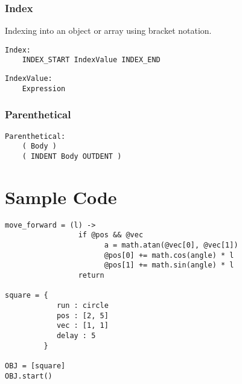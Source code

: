 \documentclass[10pt]{report}
\begin{document}
\subsection{Index}
Indexing into an object or array using bracket notation.
\begin{verbatim}
Index:
    INDEX_START IndexValue INDEX_END
\end{verbatim}

\begin{verbatim}
IndexValue:
    Expression
\end{verbatim}


\subsection{Parenthetical}

\begin{verbatim}
Parenthetical:
    ( Body )
    ( INDENT Body OUTDENT )
\end{verbatim}



\chapter{Sample Code}
\label{chap:sample}

\begin{verbatim}
move_forward = (l) ->
                 if @pos && @vec
                       a = math.atan(@vec[0], @vec[1])
                       @pos[0] += math.cos(angle) * l
                       @pos[1] += math.sin(angle) * l
                 return

square = {
            run : circle
            pos : [2, 5]
            vec : [1, 1]
            delay : 5
         }

OBJ = [square]
OBJ.start()

\end{verbatim}
\end{document}
